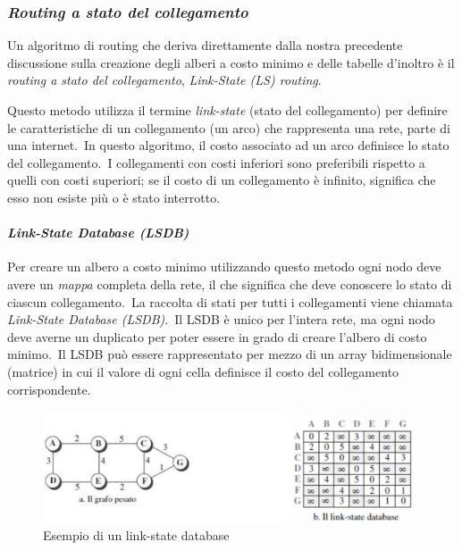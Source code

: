 \subsubsection{\emph{Routing a stato del collegamento}}

Un algoritmo di routing che deriva direttamente dalla nostra precedente discussione sulla creazione degli alberi a costo minimo e delle tabelle d'inoltro è il \emph{routing a stato del collegamento}, \emph{Link-State (LS) routing}.

Questo metodo utilizza il termine \emph{link-state} (stato del collegamento) per definire le caratteristiche di un collegamento (un arco) che rappresenta una rete, parte di una internet.\
In questo algoritmo, il costo associato ad un arco definisce lo stato del collegamento.\
I collegamenti con costi inferiori sono preferibili rispetto a quelli con costi superiori; se il costo di un collegamento è infinito, significa che esso non esiste più o è stato interrotto.

\paragraph{\emph{Link-State Database (LSDB)}}

Per creare un albero a costo minimo utilizzando questo metodo ogni nodo deve avere un \emph{mappa} completa della rete, il che significa che deve conoscere lo stato di ciascun collegamento.\
La raccolta di stati per tutti i collegamenti viene chiamata \emph{Link-State Database (LSDB)}.\
Il LSDB è unico per l'intera rete, ma ogni nodo deve averne un duplicato per poter essere in grado di creare l'albero di costo minimo.\
Il LSDB può essere rappresentato per mezzo di un array bidimensionale (matrice) in cui il valore di ogni cella definisce il costo del collegamento corrispondente.

\begin{figure}[H]
    \centering
    \includegraphics[width=\textwidth]{immagini/LSDB.png}
    \caption*{Esempio di un link-state database}
\end{figure}

